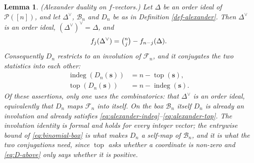\documentclass[11pt, a4paper, abstract=yes]{scrartcl}
\theoremstyle{definition}
\theoremstyle{remark}
\theoremstyle{plain}
\newtheorem{lemma}[definition]{Lemma}
\newcommand{\vek}[1]{\boldsymbol{#1}}
\newcommand{\indeg}{\operatorname{indeg}}
\newcommand{\tp}{\operatorname{top}}
\begin{document}
\begin{lemma}
(\emph{Alexander duality on \(f\)-vectors.}) Let \(\Delta\) be an order ideal of \(\mathcal P([n])\),
and let \(\Delta^{\vee}\), \(\mathcal B_n\) and \(D_n\) be as in Definition \ref{def-alexander}.
Then \(\Delta^{\vee}\) is an order ideal, \((\Delta^{\vee})^{\vee}=\Delta\), and
\begin{equation}\label{eq:alexander-f}
  f_j(\Delta^{\vee})=\tbinom nj-f_{n-j}(\Delta).
\end{equation}
Consequently \(D_n\) restricts to an involution of \(\mathcal F_n\), and it conjugates the two
statistics into each other:
\begin{align}
  \indeg(D_n(\vek s)) &= n-\tp(\vek s),\label{eq:alexander-indeg}\\
  \tp(D_n(\vek s)) &= n-\indeg(\vek s).\label{eq:alexander-top}
\end{align}
Of these assertions, only one uses the combinatorics: that \(\Delta^{\vee}\) is an order ideal,
equivalently that \(D_n\) maps \(\mathcal F_n\) into itself. On the box \(\mathcal B_n\) itself
\(D_n\) is already an involution and already satisfies
\eqref{eq:alexander-indeg}--\eqref{eq:alexander-top}. The involution identity is formal and holds
for every integer vector; the entrywise bound of \eqref{eq:binomial-box} is what makes \(D_n\) a
self-map of \(\mathcal B_n\), and it is what the two conjugations need, since \(\tp\) asks whether a
coordinate is non-zero and \eqref{eq:D-above} only says whether it is positive.
\label{lem-alexander}
\end{lemma}
\end{document}
